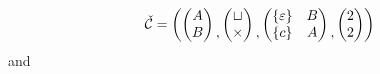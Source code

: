 \[
    \check{\mathcal{C}} = \left(
        \begin{pmatrix}
            A\\
            B
        \end{pmatrix}
        \begin{matrix}\\,\end{matrix}
        \begin{pmatrix}
            \sqcup\\
            \times
        \end{pmatrix}
        \begin{matrix}\\,\end{matrix}
        \begin{pmatrix}
            \left\{\varepsilon\right\} & B\\
            \left\{c\right\} & A
        \end{pmatrix}
        \begin{matrix}\\,\end{matrix}
        \begin{pmatrix}
            2\\
            2
        \end{pmatrix}
    \right)
\]
and
